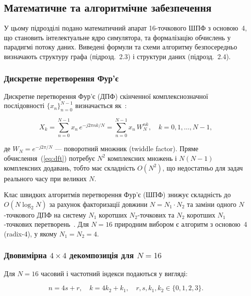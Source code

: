 \subsection{Математичне та алгоритмічне забезпечення}

У цьому підрозділі подано математичний апарат 16-точкового ШПФ
з основою~4, що становить інтелектуальне ядро симулятора, та формалізацію
обчислень у парадигмі потоку даних. Виведені формули та схеми алгоритму
безпосередньо визначають структуру графа (підрозд.~2.3) і структури
даних (підрозд.~2.4).

\subsubsection*{Дискретне перетворення Фур'є}

Дискретне перетворення Фур'є (ДПФ) скінченної комплекснозначної
послідовності $\{x_n\}_{n=0}^{N-1}$ визначається
як~\cite{nussbaumer1982,protsko2025}:

\begin{equation}
  X_k = \sum_{n=0}^{N-1} x_n \, e^{-j 2\pi n k / N}
       = \sum_{n=0}^{N-1} x_n \, W_N^{n k},
  \quad k = 0, 1, \ldots, N-1,
  \label{eq:dft}
\end{equation}

де $W_N = e^{-j 2\pi/N}$ --- поворотний множник (twiddle factor).
Пряме обчислення~(\ref{eq:dft}) потребує $N^2$ комплексних множень
і $N(N-1)$ комплексних додавань, тобто має складність $O(N^2)$, що
недостатньо для задач реального часу при великих $N$.

Клас швидких алгоритмів перетворення Фур'є (ШПФ) знижує складність
до $O(N \log_2 N)$ за рахунок факторизації довжини
$N = N_1 \cdot N_2$ та заміни одного $N$-точкового ДПФ на систему
$N_1$ коротших $N_2$-точкових та $N_2$ коротших $N_1$-точкових
перетворень~\cite{cooley1965,nussbaumer1982}. Для $N = 16$ природним
вибором є алгоритм з основою~4 (radix-4), у якому $N_1 = N_2 = 4$.

\subsubsection*{Двовимірна $4 \times 4$ декомпозиція для $N = 16$}

Для $N = 16$ часовий і частотний індекси подаються у вигляді:

\begin{equation}
  n = 4s + r, \quad k = 4k_2 + k_1, \quad r, s, k_1, k_2 \in \{0,1,2,3\}.
  \label{eq:idx_map}
\end{equation}

